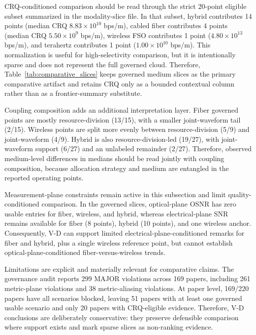 \documentclass[lettersize,journal]{IEEEtran}
\begin{document}
CRQ-conditioned comparison should be read through the strict 20-point eligible subset summarized in the modality-slice file. In that subset, hybrid contributes 14 points (median CRQ $8.83 \times 10^{10}$ bps/m), cabled fiber contributes 4 points (median CRQ $5.50 \times 10^9$ bps/m), wireless FSO contributes 1 point ($4.80 \times 10^{13}$ bps/m), and terahertz contributes 1 point ($1.00 \times 10^{10}$ bps/m). This normalization is useful for high-selectivity comparison, but it is intentionally sparse and does not represent the full governed cloud. Therefore, Table~\ref{tab:comparative_slices} keeps governed medium slices as the primary comparative artifact and retains CRQ only as a bounded contextual column rather than as a frontier-summary substitute.

Coupling composition adds an additional interpretation layer. Fiber governed points are mostly resource-division (13/15), with a smaller joint-waveform tail (2/15). Wireless points are split more evenly between resource-division (5/9) and joint-waveform (4/9). Hybrid is also resource-division-led (19/27), with joint-waveform support (6/27) and an unlabeled remainder (2/27). Therefore, observed medium-level differences in medians should be read jointly with coupling composition, because allocation strategy and medium are entangled in the reported operating points.

Measurement-plane constraints remain active in this subsection and limit quality-conditioned comparison. In the governed slices, optical-plane OSNR has zero usable entries for fiber, wireless, and hybrid, whereas electrical-plane SNR remains available for fiber (8 points), hybrid (10 points), and one wireless anchor. Consequently, V-D can support limited electrical-plane-conditioned remarks for fiber and hybrid, plus a single wireless reference point, but cannot establish optical-plane-conditioned fiber-versus-wireless trends.

Limitations are explicit and materially relevant for comparative claims. The governance audit reports 299 MAJOR violations across 169 papers, including 261 metric-plane violations and 38 metric-aliasing violations. At paper level, 169/220 papers have all scenarios blocked, leaving 51 papers with at least one governed usable scenario and only 20 papers with CRQ-eligible evidence. Therefore, V-D conclusions are deliberately conservative: they preserve defensible comparison where support exists and mark sparse slices as non-ranking evidence.
\end{document}
